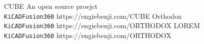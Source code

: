 \documentclass[9pt]{developercv} %
\begin{document}
\vspace{0.5cm}


\begin{entrylist}
	\QRentry
		{CUBE}
		{An open source proejct \\ \texttt{KiCAD}\slashsep\texttt{Fusion360}}
		{https://engiebenji.com/CUBE}
	\QRentry
		{Orthodox}
		{\lorem\lorem\\ \texttt{KiCAD}\slashsep\texttt{Fusion360}}
		{https://engiebenji.com/ORTHODOX}
	\QRentry
		{LOREM}
		{\lorem\lorem\\ \texttt{KiCAD}\slashsep\texttt{Fusion360}}
		{https://engiebenji.com/ORTHODOX}
\end{entrylist}

\end{document}
